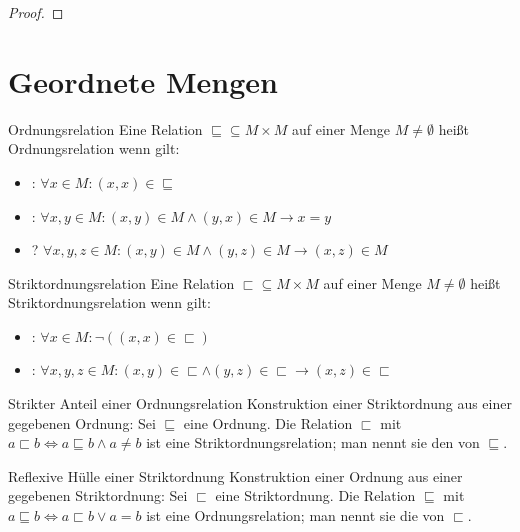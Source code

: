 \documentclass{scrartcl}
\begin{document}
\begin{proof}
\end{proof}


\section{Geordnete Mengen}

\begin{definition}{Ordnungsrelation}
Eine Relation $⊑ ⊆ M × M$ auf einer Menge $M ≠ ∅$ heißt Ordnungsrelation
wenn gilt:
\begin{itemize}
\item {}: $∀ x ∈ M: (x,x) ∈ ⊑$
\item {}: $∀ x, y ∈ M: (x,y) ∈ M ∧ (y,x) ∈ M → x = y$
\item {}? $∀ x, y, z ∈ M: (x,y) ∈ M ∧ (y,z) ∈ M → (x,z) ∈ M$
\end{itemize}
\end{definition}

\begin{definition}{Striktordnungsrelation}
Eine Relation $⊏ ⊆ M × M$ auf einer Menge $M ≠ ∅$ heißt Striktordnungsrelation
wenn gilt:
\begin{itemize}
\item {}: $∀ x ∈ M: ¬((x,x) ∈ ⊏)$
\item {}: $∀ x, y ,z ∈ M: (x,y) ∈ ⊏ ∧ (y,z) ∈ ⊏ → (x,z) ∈ ⊏$
\end{itemize}
\end{definition}

\begin{definition}{Strikter Anteil einer Ordnungsrelation}
Konstruktion einer Striktordnung aus einer gegebenen Ordnung:
Sei $⊑$ eine Ordnung. Die Relation $⊏$ mit
$a ⊏ b ⇔ a ⊑ b ∧ a ≠ b$ ist eine Striktordnungsrelation;
man nennt sie den  von $⊑$.
\end{definition}

\begin{definition}{Reflexive Hülle einer Striktordnung}
Konstruktion einer Ordnung aus einer gegebenen Striktordnung:
Sei $⊏$ eine Striktordnung. Die Relation $⊑$ mit 
$a ⊑ b ⇔ a ⊏ b ∨ a = b$ ist eine Ordnungsrelation;
man nennt sie die  von $⊏$.
\end{definition}
\end{document}
